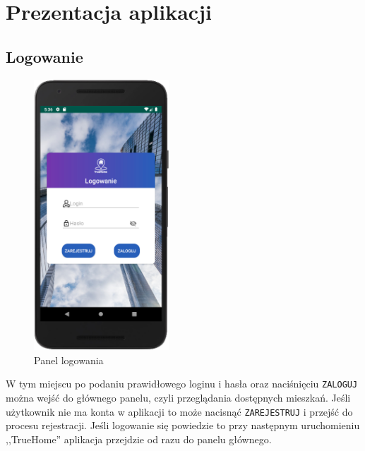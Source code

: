 \documentclass[polish, 11pt]{article}
\begin{document}
\section{Prezentacja aplikacji}

    \subsection{Logowanie}
        \begin{figure}[H]
                    \centering
                    \includegraphics[width=0.45\textwidth]{aplikacja/logowanie.png}
                    \caption{Panel logowania}
        \end{figure}
        
         W tym miejscu po podaniu prawidłowego loginu i hasła oraz naciśnięciu \texttt{ZALOGUJ} można wejść do głównego panelu, czyli przeglądania dostępnych mieszkań. Jeśli użytkownik nie ma konta w aplikacji to może nacisnąć \texttt{ZAREJESTRUJ} i przejść do procesu rejestracji. Jeśli logowanie się powiedzie to przy następnym uruchomieniu ,,TrueHome'' aplikacja przejdzie od razu do panelu głównego.
\end{document}
